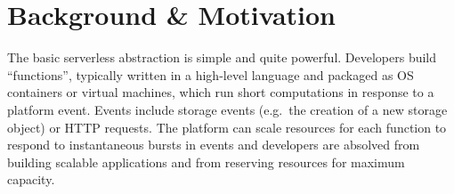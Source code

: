 \section{Background \& Motivation}\label{sec:bg}




The basic serverless abstraction is simple and quite powerful. Developers build
``functions'', typically written in a high-level language and packaged as OS
containers or virtual machines, which run short computations in response to a
platform event. Events include storage events (e.g.\ the creation of a new
storage object) or HTTP requests. The platform can scale resources for each
function to respond to instantaneous bursts in events and developers are
absolved from building scalable applications and from reserving resources for
maximum capacity.

